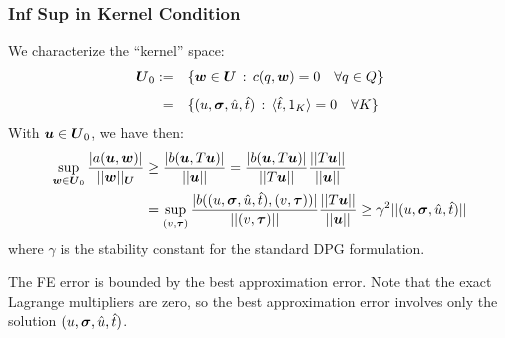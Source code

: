 \documentclass{beamer}
\begin{document}
\begin{frame}
\frametitle{Inf Sup in Kernel Condition}
We characterize the ``kernel'' space:
\begin{equation*}
\begin{array}{rl}
\boldsymbol U_0  := & \{ \boldsymbol w \in \boldsymbol U \, : \, c(q,\boldsymbol w) = 0 \quad \forall q \in Q\} \\[8pt]
 = &\{ (u,\boldsymbol\sigma,\hat{u},\hat{t}) \, : \, \langle \hat{t},1_K \rangle = 0
 \quad \forall K \}
\end{array}
\end{equation*}
With $\boldsymbol u \in \boldsymbol U_0$, we have then:
\begin{align*}
   \sup_{\boldsymbol w \in \boldsymbol U_0} \frac{| a(\boldsymbol u,\boldsymbol w) |}{|| \boldsymbol w ||_{\boldsymbol U} }
   &\geq \frac{| b(\boldsymbol u,T \boldsymbol u) |}{|| \boldsymbol u ||}
   = \frac{| b(\boldsymbol u,T \boldsymbol u) |}{|| T\boldsymbol u ||}\frac{||T\boldsymbol u||}{||\boldsymbol u||}\\
   &= \sup_{(v,\boldsymbol\tau)}\frac{| b((u,\boldsymbol\sigma,\hat{u},\hat{t}), (v,\boldsymbol\tau)) |}{|| (v,\boldsymbol\tau) ||}
   \frac{||T\boldsymbol u||}{||\boldsymbol u||}
   \geq \gamma^2 || (u,\boldsymbol\sigma,\hat{u},\hat{t}) ||
\end{align*}
where $\gamma$ is the stability constant for the standard DPG formulation.

The FE error is bounded by the best approximation error. Note that the exact
Lagrange multipliers are zero, so the best approximation error involves only
the solution $(u,\boldsymbol\sigma,\hat{u},\hat{t})$.
\end{frame}

\end{document}
